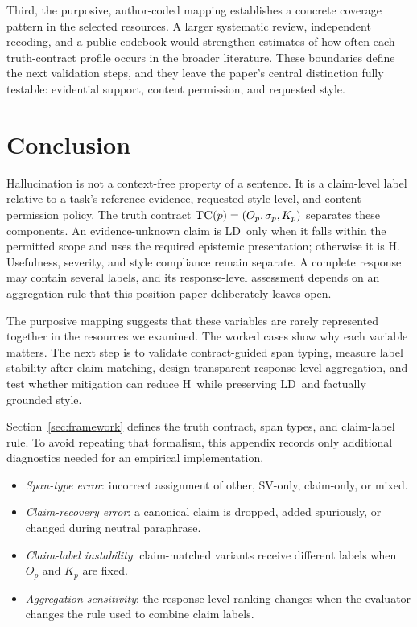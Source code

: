\documentclass{clv2025}
\newcommand{\TC}{\textsc{TC}}
\newcommand{\LD}{\textsc{LD}}
\newcommand{\Hall}{\textsc{H}}
\begin{document}
Third, the purposive, author-coded mapping establishes a concrete coverage pattern in the selected resources.
A larger systematic review, independent recoding, and a public codebook would strengthen estimates of how often each truth-contract profile occurs in the broader literature.
These boundaries define the next validation steps, and they leave the paper's central distinction fully testable: evidential support, content permission, and requested style.

\section{Conclusion}\label{sec:conclusion}

Hallucination is not a context-free property of a sentence.
It is a claim-level label relative to a task's reference evidence, requested style level, and content-permission policy.
The truth contract $\TC(p)=(O_p,\sigma_p,K_p)$ separates these components.
An evidence-unknown claim is \LD\ only when it falls within the permitted scope and uses the required epistemic presentation; otherwise it is \Hall.
Usefulness, severity, and style compliance remain separate.
A complete response may contain several labels, and its response-level assessment depends on an aggregation rule that this position paper deliberately leaves open.

The purposive mapping suggests that these variables are rarely represented together in the resources we examined.
The worked cases show why each variable matters.
The next step is to validate contract-guided span typing, measure label stability after claim matching, design transparent response-level aggregation, and test whether mitigation can reduce \Hall\ while preserving \LD\ and factually grounded style.

\appendix

%
\makeatletter\def\@currentlabel{A}\makeatother\label{app:diagnostics}

Section~\ref{sec:framework} defines the truth contract, span types, and claim-label rule.
To avoid repeating that formalism, this appendix records only additional diagnostics needed for an empirical implementation.

\begin{itemize}
  \item \emph{Span-type error}: incorrect assignment of other, SV-only, claim-only, or mixed.
  \item \emph{Claim-recovery error}: a canonical claim is dropped, added spuriously, or changed during neutral paraphrase.
  \item \emph{Claim-label instability}: claim-matched variants receive different labels when $O_p$ and $K_p$ are fixed.
  \item \emph{Aggregation sensitivity}: the response-level ranking changes when the evaluator changes the rule used to combine claim labels.
\end{itemize}
\end{document}
